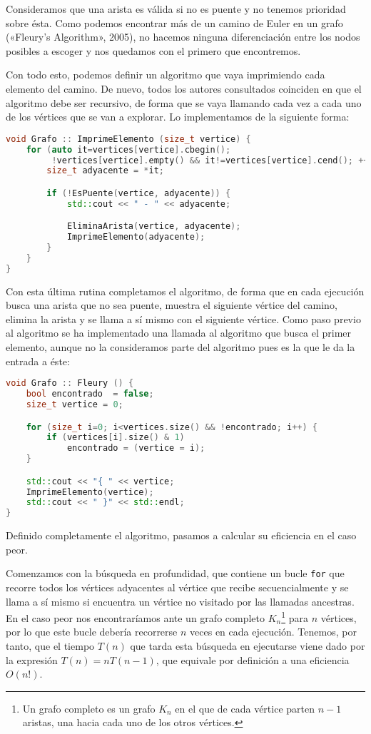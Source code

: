 Consideramos que una arista es válida si no es puente y no tenemos prioridad sobre ésta.
Como podemos encontrar más de un camino de Euler en un grafo («Fleury’s Algorithm», 2005), no hacemos ninguna diferenciación entre los nodos posibles a escoger y nos quedamos con el primero que encontremos.

Con todo esto, podemos definir un algoritmo que vaya imprimiendo cada elemento del camino.
De nuevo, todos los autores consultados coinciden en que el algoritmo debe ser recursivo, de forma que se vaya llamando cada vez a cada uno de los vértices que se van a explorar.
Lo implementamos de la siguiente forma:

\begin{lstlisting}[language=C++]
void Grafo :: ImprimeElemento (size_t vertice) {
	for (auto it=vertices[vertice].cbegin();
	     !vertices[vertice].empty() && it!=vertices[vertice].cend(); ++it) {
		size_t adyacente = *it;

		if (!EsPuente(vertice, adyacente)) {
			std::cout << " - " << adyacente;

			EliminaArista(vertice, adyacente);
			ImprimeElemento(adyacente);
		}
	}
}
\end{lstlisting}

Con esta última rutina completamos el algoritmo, de forma que en cada ejecución busca una arista que no sea puente, muestra el siguiente vértice del camino, elimina la arista y se llama a sí mismo con el siguiente vértice.
Como paso previo al algoritmo se ha implementado una llamada al algoritmo que busca el primer elemento, aunque no la consideramos parte del algoritmo pues es la que le da la entrada a éste:

\pagebreak

\begin{lstlisting}[language=C++]
void Grafo :: Fleury () {
	bool encontrado  = false;
	size_t vertice = 0;

	for (size_t i=0; i<vertices.size() && !encontrado; i++) {
		if (vertices[i].size() & 1)
			encontrado = (vertice = i);
	}

	std::cout << "{ " << vertice;
	ImprimeElemento(vertice);
	std::cout << " }" << std::endl;
}
\end{lstlisting}

Definido completamente el algoritmo, pasamos a calcular su eficiencia en el caso peor.

Comenzamos con la búsqueda en profundidad, que contiene un bucle \texttt{for} que recorre todos los vértices adyacentes al vértice que recibe secuencialmente y se llama a sí mismo si encuentra un vértice no visitado por las llamadas ancestras.
En el caso peor nos encontraríamos ante un grafo completo $K_n$\footnote{%
	Un grafo completo es un grafo $K_n$ en el que de cada vértice parten $n-1$ aristas, una hacia cada uno de los otros vértices.
} para $n$ vértices, por lo que este bucle debería recorrerse $n$ veces en cada ejecución.
Tenemos, por tanto, que el tiempo $T(n)$ que tarda esta búsqueda en ejecutarse viene dado por la expresión $T(n)=nT(n-1)$, que equivale por definición a una eficiencia $O(n!)$.


